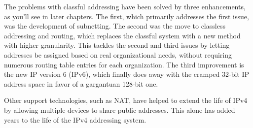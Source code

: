 The problems with classful addressing have been solved by three
enhancements, as you'll see in later chapters. The first, which
primarily addresses the first issue, was the development of subnetting.
The second was the move to classless addressing and routing, which
replaces the classful system with a new method with higher granularity.
This tackles the second and third issues by letting addresses be
assigned based on real organizational needs, without requiring numerous
routing table entries for each organization. The third improvement is
the new IP version 6 (IPv6), which finally does away with the cramped
32-bit IP address space in favor of a gargantuan 128-bit one.

Other support technologies, such as NAT, have helped to extend the life
of IPv4 by allowing multiple devices to share public addresses. This
alone has added years to the life of the IPv4 addressing system.

